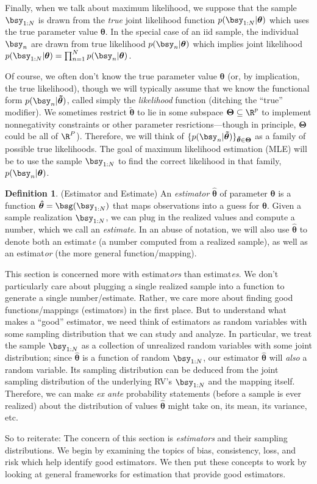 \documentclass[12pt]{article}
\theoremstyle{plain}
\theoremstyle{definition}
\newtheorem{defn}[thm]{Definition}
\theoremstyle{remark}
\newcommand{\bstheta}{\boldsymbol{\theta}}
\newcommand{\bsTheta}{\boldsymbol{\Theta}}
\newcommand{\bshattheta}{\boldsymbol{\hat{\theta}}}
\newcommand{\bstildetheta}{\boldsymbol{\tilde{\theta}}}
\newcommand{\nN}{_{n=1}^N}
\begin{document}
Finally, when we talk about maximum likelihood, we suppose that the
sample $\bsy_{1:N}$ is drawn from the \emph{true} joint likelihood
function $p(\bsy_{1:N}|\bstheta)$ which uses the true parameter value
$\bstheta$. In the special case of an iid sample, the individual
$\bsy_n$ are drawn from true likelihood $p(\bsy_n|\bstheta)$ which
implies joint likelihood
$p(\bsy_{1:N}|\bstheta)=\prod\nN p(\bsy_n|\bstheta)$.

Of course, we often don't know the true parameter value $\bstheta$ (or,
by implication, the true likelihood), though we will typically assume
that we know the functional form $p(\bsy_n|\bstildetheta)$, called
simply the \emph{likelihood} function (ditching the ``true'' modifier).
We sometimes restrict $\bstildetheta$ to lie in some subspace
$\bsTheta\subseteq\R^p$ to implement nonnegativity constraints or other
parameter resrictions---though in principle, $\bsTheta$ could be all of
$\R^P$). Therefore, we will think of
$\{p(\bsy_n|\bstildetheta)\}_{\bstildetheta\in\bsTheta}$ as a family of
possible true likelihoods. The goal of maximum likelihood estimation
(MLE) will be to use the sample $\bsy_{1:N}$ to find the correct
likelihood in that family, $p(\bsy_n|\bstheta)$.

\begin{defn}(Estimator and Estimate)
An \emph{estimator} $\bshattheta$ of parameter $\bstheta$ is a function
$\bshattheta = \bsg(\bsy_{1:N})$ that maps observations into a guess for
$\bstheta$.
Given a sample realization $\bsy_{1:N}$, we can plug in the realized
values and compute a number, which we call an \emph{estimate}. In an
abuse of notation, we will also use $\bshattheta$ to denote both an
estimat\emph{e} (a number computed from a realized sample), as well as
an estimat\emph{or} (the more general function/mapping).

This section is concerned more with estimat\emph{ors} than
estimat\emph{es}. We don't particularly care about plugging a single
realized sample into a function to generate a single number/estimate.
Rather, we care more about finding good functions/mappings (estimators)
in the first place. But to understand what makes a ``good'' estimator,
we need think of estimators as random variables with some sampling
distribution that we can study and analyze. In particular, we treat the
sample $\bsy_{1:N}$ as a collection of unrealized random variables with
some joint distribution; since $\bshattheta$ is a function of random
$\bsy_{1:N}$, our estimator $\bshattheta$ will \emph{also} a random
variable. Its sampling distribution can be deduced from the joint
sampling distribution of the underlying RV's $\bsy_{1:N}$ and the
mapping itself. Therefore, we can make \emph{ex ante} probability
statements (before a sample is ever realized) about the distribution of
values $\bshattheta$ might take on, its mean, its variance, etc.

So to reiterate: The concern of this section is \emph{estimators} and
their sampling distributions. We begin by examining the topics of bias,
consistency, loss, and risk which help identify good estimators. We then
put these concepts to work by looking at general frameworks for
estimation that provide good estimators.
\end{defn}
\end{document}
